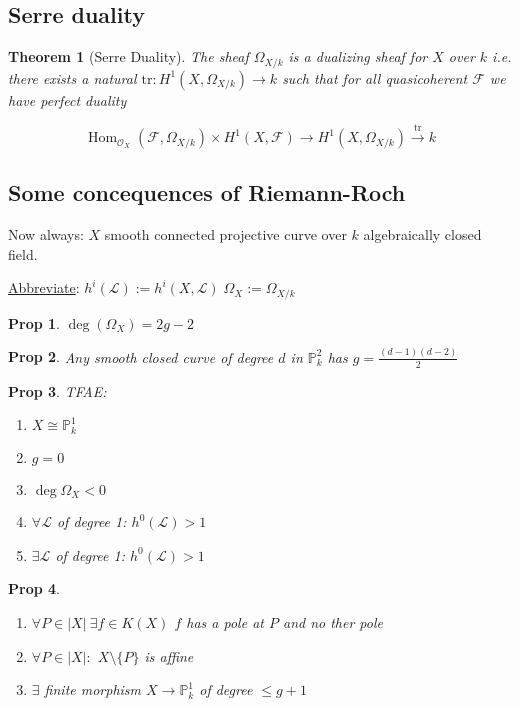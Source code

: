 \documentclass[a4paper, 12pt]{article}
\newcommand{\caf}{\mathcal{F}}
\newcommand{\cl}{\mathcal{L}}
\newcommand{\ox}{\mathcal{O}_X}
\newcommand{\bbp}{\mathbb{P}}
\newtheorem*{prop}{Prop}
\newtheorem*{thm}{Theorem}
\DeclareMathOperator{\Hom}{Hom}
\begin{document}
	
	
	
	\subsection{Serre duality}
	
		\begin{thm}[Serre Duality]
			The sheaf $ \Omega_{X/k} $ is a dualizing sheaf for $ X $ over $ k $ i.e. there exists a natural $ \mathrm{tr}: H^1(X,\Omega_{X/k}) \rightarrow k $ such that for all quasicoherent $ \caf $ we have perfect duality
			
			\[ \Hom_{\ox}(\caf, \Omega_{X/k}) \times H^1(X,\caf) \longrightarrow H^1(X, \Omega_{X/k}) \xrightarrow{\mathrm{tr}} k \]
		\end{thm}
	
	
	\subsection{Some concequences of Riemann-Roch}
	
	Now always: $ X $ smooth connected projective curve over $ k $ algebraically closed field.
	
	\underline{Abbreviate}: $  h^i(\cl) := h^i(X, \cl) \; \Omega_X := \Omega_{X/k} $
	
	\begin{prop}
		$ \deg(\Omega_{X}) = 2g -2 $
	\end{prop}	
	
	\begin{prop}
		Any smooth closed curve of degree $ d $ in $ \bbp^2_k $ has $ g = \frac{(d-1)(d-2)}{2} $
	\end{prop}
	
	\begin{prop}
		TFAE:
		\begin{enumerate}
			\item $ X \cong \bbp^1_k $
			\item $ g=0 $
			\item $ \deg \Omega_X < 0 $
			\item $ \forall \cl $ of degree 1: $ h^0(\cl) > 1 $
			\item $ \exists \cl $ of degree 1: $ h^0(\cl) > 1 $
		\end{enumerate}
	\end{prop}
	
	\begin{prop}
		\begin{enumerate}
			\item $ \forall P \in |X| \: \exists f \in K(X) $ $ f $ has a pole at $ P $ and no ther pole
			\item $ \forall P \in |X| : $ $ X\setminus\{P\} $ is affine
			\item $ \exists $ finite morphism $ X \rightarrow \bbp^1_k $ of degree $ \le g+1 $
		\end{enumerate}
	\end{prop}
	
\end{document}
